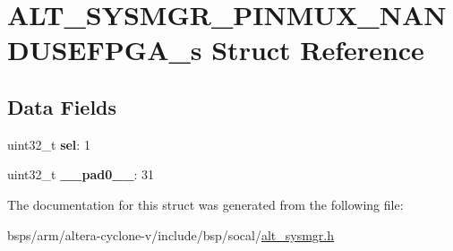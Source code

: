 \hypertarget{structALT__SYSMGR__PINMUX__NANDUSEFPGA__s}{}\section{A\+L\+T\+\_\+\+S\+Y\+S\+M\+G\+R\+\_\+\+P\+I\+N\+M\+U\+X\+\_\+\+N\+A\+N\+D\+U\+S\+E\+F\+P\+G\+A\+\_\+s Struct Reference}
\label{structALT__SYSMGR__PINMUX__NANDUSEFPGA__s}
\subsection*{Data Fields}
\begin{DoxyCompactItemize}
\item 
\mbox{\label{structALT__SYSMGR__PINMUX__NANDUSEFPGA__s_a79389a99c7ac532f25af613d77e19519}} 
uint32\+\_\+t {\bfseries sel}\+: 1
\item 
\mbox{\label{structALT__SYSMGR__PINMUX__NANDUSEFPGA__s_a132636bfa6bc8e992f3cde523f160ddf}} 
uint32\+\_\+t {\bfseries \+\_\+\+\_\+pad0\+\_\+\+\_\+}\+: 31
\end{DoxyCompactItemize}


The documentation for this struct was generated from the following file\+:\begin{DoxyCompactItemize}
\item 
bsps/arm/altera-\/cyclone-\/v/include/bsp/socal/\mbox{\hyperlink{alt__sysmgr_8h}{alt\+\_\+sysmgr.\+h}}\end{DoxyCompactItemize}
